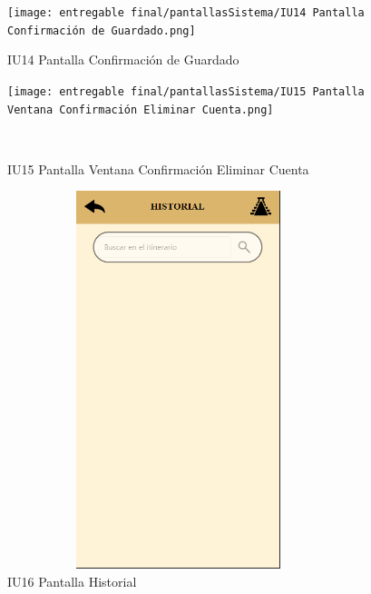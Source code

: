 \begin{figure}[htb]
    \begin{minipage}{1\textwidth}
    \centering
    \texttt{[image: entregable final/pantallasSistema/IU14 Pantalla Confirmación de Guardado.png]}
    \caption{IU14 Pantalla Confirmación de Guardado}
\end{minipage}

    \begin{minipage}{1\textwidth}
        \centering
        \texttt{[image: entregable final/pantallasSistema/IU15 Pantalla Ventana Confirmación Eliminar Cuenta.png]}
        \caption{IU15 Pantalla Ventana Confirmación Eliminar Cuenta}
    \end{minipage}
    \\
\end{figure}
\begin{figure}[htb]
    \begin{minipage}{1\textwidth}
    \centering
    \includegraphics[width=10cm, height=11cm]{entregable final/pantallasSistema/IU16 Pantalla Historial.png}
    \caption{IU16 Pantalla Historial}
\end{minipage}


\end{figure}
